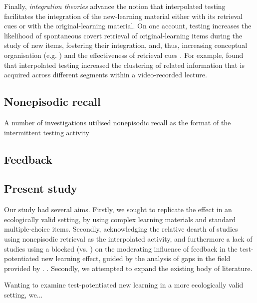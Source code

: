 \documentclass[../main.tex]{subfiles}
\begin{document}
Finally, \textit{integration theories} advance the notion that interpolated testing facilitates the integration of the new-learning material either with its retrieval cues or with the original-learning material. On one account, testing increases the likelihood of spontaneous covert retrieval of original-learning items during the study of new items, fostering their integration, and, thus, increasing conceptual organisation (e.g. \citealp{jingInterpolatedTestingInfluences2016}) and the effectiveness of retrieval cues \citep{pycWhyTestingImproves2010}. For example, \cite{jingInterpolatedTestingInfluences2016} found that interpolated testing increased the clustering of related information that is acquired across different segments within a video-recorded lecture.

\subsection{Nonepisodic recall}


A number of investigations utilised nonepisodic recall as the format of the intermittent testing activity \cite{divisRetrievalSpeedsContext2014, pastotterRetrievalLearningFacilitates2011, }



\subsection{Feedback}


\subsection{Present study}

Our study had several aims. Firstly, we sought to replicate the effect in an ecologically valid setting, by using complex learning materials and standard multiple-choice items. Secondly, acknowledging the relative dearth of studies using nonepisodic retrieval as the interpolated activity, and furthermore a lack of studies using a blocked (vs. ) on the moderating influence of feedback in the test-potentiated new learning effect,    guided by the analysis of gaps in the field provided by \cite{chanRetrievalPotentiatesNew2018}. .  Secondly, we attempted to expand the existing body of literature.

Wanting to examine test-potentiated new learning in a more ecologically valid setting, we...
\end{document}

